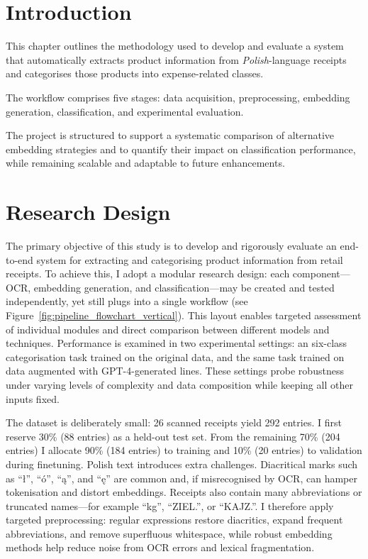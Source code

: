 \documentclass{SGGW-thesis-EN}
\begin{document}
\section{Introduction}

This chapter outlines the methodology used to develop and evaluate a system that
automatically extracts product information from \textit{Polish}-language receipts and
categorises those products into expense-related classes.

The workflow comprises five stages: data acquisition, preprocessing, embedding generation,
classification, and experimental evaluation.

The project is structured to support a systematic comparison of alternative embedding
strategies and to quantify their impact on classification performance, while remaining
scalable and adaptable to future enhancements.


\section{Research Design}
The primary objective of this study is to develop and rigorously evaluate an end-to-end system for extracting and
categorising product information from retail receipts.  To achieve this, I adopt a modular research design: each
component—OCR, embedding generation, and classification—may be created and tested independently, yet still plugs into a
single workflow (see Figure~\ref{fig:pipeline_flowchart_vertical}).  This layout enables targeted assessment of individual modules and direct comparison between different
models and techniques.  Performance is examined in two experimental settings: an six-class categorisation task trained
on the original data, and the same task trained on data augmented with GPT-4-generated lines.
These settings probe robustness under varying levels of complexity and data composition while keeping all other inputs
fixed.

The dataset is deliberately small: 26 scanned receipts yield 292 entries.  I first reserve 30\% (88 entries)
as a held-out test set.  From the remaining 70\% (204 entries) I allocate 90\% (184 entries) to training and 10\%
(20 entries) to validation during finetuning.
Polish text introduces extra challenges.  Diacritical marks such as “ł”, “ó”, “ą”, and “ę” are common and, if
misrecognised by OCR, can hamper tokenisation and distort embeddings.  Receipts also contain many abbreviations or
truncated names—for example “kg”, “ZIEL.”, or “KAJZ.”.  I therefore apply targeted preprocessing: regular expressions
restore diacritics, expand frequent abbreviations, and remove superfluous whitespace, while robust embedding methods
help reduce noise from OCR errors and lexical fragmentation.
\end{document}

